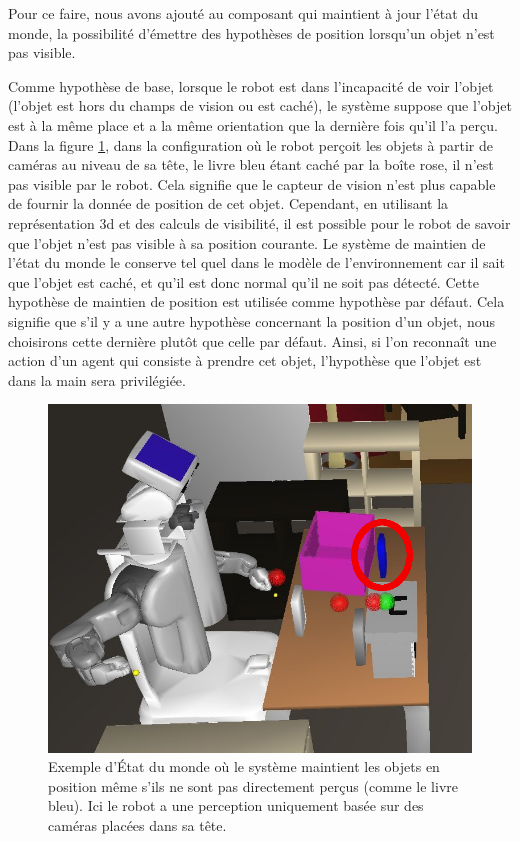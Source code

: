\documentclass[a4paper,11pt,twoside]{StyleThese}
\begin{document}
Pour ce faire, nous avons ajouté au composant qui maintient à jour l'état du monde, la possibilité d'émettre des hypothèses de position lorsqu'un objet n'est pas visible.

Comme hypothèse de base, lorsque le robot est dans l'incapacité de voir l'objet (l'objet est hors du champs de vision ou est caché), le système suppose que l'objet est à la même place et a la même orientation que la dernière fois qu'il l'a perçu. Dans la figure \ref{fig:occluded}, dans la configuration où le robot perçoit les objets à partir de caméras au niveau de sa tête, 
le livre bleu étant caché par la boîte rose, il n'est pas visible par le robot. Cela signifie que le capteur de vision n'est plus capable de fournir la donnée de position de cet objet. Cependant, en utilisant la représentation 3d et des calculs de visibilité, il est possible pour le robot de savoir que l'objet n'est pas visible à sa position courante. Le système de maintien de l'état du monde le conserve tel quel dans le modèle de l'environnement car il sait que l'objet est caché, et qu'il est donc normal qu'il ne soit pas détecté. Cette hypothèse de maintien de position est utilisée comme hypothèse par défaut. Cela signifie que s'il y a une autre hypothèse concernant la position d'un objet, nous choisirons cette dernière plutôt que celle par défaut.
Ainsi, si l'on reconnaît une action d'un agent qui consiste à prendre cet objet, l'hypothèse que l'objet est dans la main sera privilégiée.

\begin{figure}[ht!]
 \centering
  \includegraphics[width=0.69\linewidth]{./img/occluded.png} 
  \caption {Exemple d'État du monde où le système maintient les objets en position même s'ils ne sont pas directement perçus (comme le livre bleu). Ici le robot a une perception uniquement basée sur des caméras placées dans sa tête.}
  \label{fig:occluded}
\end{figure}
\end{document}

